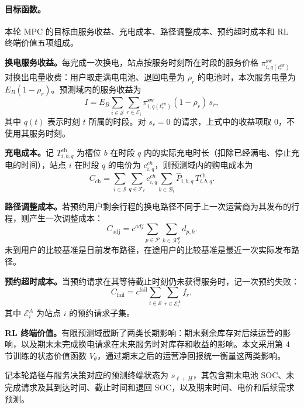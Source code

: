 \documentclass[12pt,a4paper,UTF8]{ctexart}
\begin{document}
\paragraph{目标函数。}
本轮 MPC 的目标由服务收益、充电成本、路径调整成本、预约超时成本和 RL 终端价值五项组成。

\textbf{换电服务收益。}每完成一次换电，站点按服务时刻所在时段的服务价格 $\pi_{i,q(t_r^{\mathrm{sw}})}^{\mathrm{sw}}$ 对换出电量收费：用户取走满电电池、退回电量为 $\rho_r$ 的电池时，本次服务电量为 $E_B(1-\rho_r)$。预测域内的服务收益为
\begin{equation}
I
=E_B\sum_{i\in\mathcal S}
\sum_{r\in\mathcal E_i}
\pi_{i,q(t_r^{\mathrm{sw}})}^{\mathrm{sw}}(1-\rho_r)\,s_r,
\label{eq:income}
\end{equation}
其中 $q(t)$ 表示时刻 $t$ 所属的时段。对 $s_r=0$ 的请求，上式中的收益项取 $0$，不使用其服务时刻。

\textbf{充电成本。}记 $T_{i,b,q}^{\mathrm{ch}}$ 为槽位 $b$ 在时段 $q$ 内的实际充电时长（扣除已经满电、停止充电的时间），站点 $i$ 在时段 $q$ 的电价为 $c^{ch}_{i,q}$，则预测域内的购电成本为
\begin{equation}
C_{\mathrm{ch}}
=
\sum_{i\in\mathcal S}
\sum_{q\in\mathcal T_\ell}
c^{ch}_{i,q}
\sum_{b\in\mathcal B_i}
\widehat P_{i,b,q}\,T_{i,b,q}^{\mathrm{ch}}.
\label{eq:chargingcost}
\end{equation}


\textbf{路径调整成本。}若预约用户剩余行程的换电路径不同于上一次运营商为其发布的行程，则产生一次调整成本：
\begin{equation}
C_{\mathrm{adj}}
=
c^{adj}
\sum_{p\in\mathcal P}
\sum_{k\in\mathcal K_\ell^p}
d_{p,k}.
\label{eq:adjustment_cost}
\end{equation}
未到用户的比较基准是日前发布路径，在途用户的比较基准是最近一次实际发布路径。

\textbf{预约超时成本。}当预约请求在其等待截止时刻仍未获得服务时，记一次预约失败：
\begin{equation}
C_{\mathrm{fail}}
=
c^{\mathrm{fail}}
\sum_{i\in\mathcal S}
\sum_{r\in\mathcal E_{i}^{A}}
f_r,
\label{eq:reservation_failure_cost}
\end{equation}
其中 $\mathcal E_i^A$ 为站点 $i$ 的预约请求子集。

\textbf{RL 终端价值。}有限预测域截断了两类长期影响：期末剩余库存对后续运营的影响，以及期末未完成换电请求在未来服务时对库存和收益的影响。本文采用第 4 节训练的状态价值函数 $V_\theta$，通过期末之后的运营净回报统一衡量这两类影响。

记本轮路径与服务决策对应的预测终端状态为 $s_{\ell+H}$，其包含期末电池 SOC、未完成请求及其到达时间、截止时间和退回 SOC，以及期末时间、电价和后续需求预测。
\end{document}
